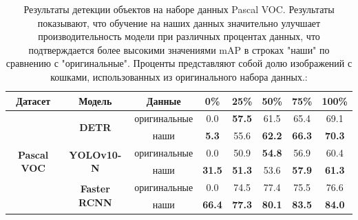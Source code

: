 \documentclass[11pt]{article}
\begin{document}

\begin{table}[]
\centering
\caption{Результаты детекции объектов на наборе данных Pascal VOC. Результаты показывают, что обучение на наших данных значительно улучшает производительность модели при различных процентах данных, что подтверждается более высокими значениями mAP в строках "наши" по сравнению с "оригинальные". Проценты представляют собой долю изображений с кошками, использованных из оригинального набора данных.:}
\begin{tabular}{ccc|ccccc}
\toprule
\textbf{Датасет} & \textbf{Модель} & \textbf{Данные} & \textbf{0\%} & \textbf{25\%} & \textbf{50\%} & \textbf{75\%} & \textbf{100\%} \\ 
\midrule
\multirow{6}{*}{\textbf{Pascal VOC}} & \multirow{2}{*}{\textbf{DETR}} & оригинальные & 0.0 & \textbf{57.5} & 61.5 & 65.4 & 69.1 \\ %
 & & наши & \textbf{5.3} & 55.6 & \textbf{62.2} & \textbf{66.3} & \textbf{70.3}

 \\ 
\cline{2-8}
 & \multirow{2}{*}{\textbf{ YOLOv10-N}} & оригинальные & 0.0 & 50.9 & \textbf{54.8} & 56.9 & 60.4 \\ %
 & & наши & \textbf{31.5} & \textbf{51.3} & 53.6 & \textbf{57.9} & \textbf{61.3} \\ 
\cline{2-8}
 & \multirow{2}{*}{\textbf{Faster RCNN}} & оригинальные & 0.0 & 74.5 & 77.4 & 75.5 & 76.6 \\ %
 & & наши & \textbf{66.4} & \textbf{77.3} & \textbf{80.1} & \textbf{83.5} & \textbf{84.0} \\ 
\bottomrule
\end{tabular}
\label{tab:combined-results}
\end{table}
\end{document}
